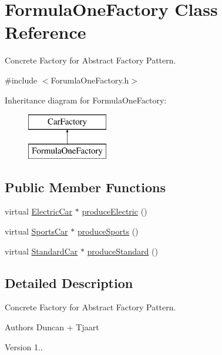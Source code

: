 \hypertarget{class_formula_one_factory}{}\section{Formula\+One\+Factory Class Reference}
\label{class_formula_one_factory}


Concrete Factory for Abstract Factory Pattern.  




{\ttfamily \#include $<$Forumla\+One\+Factory.\+h$>$}

Inheritance diagram for Formula\+One\+Factory\+:\begin{figure}[H]
\begin{center}
\leavevmode
\includegraphics[height=2.000000cm]{class_formula_one_factory}
\end{center}
\end{figure}
\subsection*{Public Member Functions}
\begin{DoxyCompactItemize}
\item 
virtual \mbox{\hyperlink{class_electric_car}{Electric\+Car}} $\ast$ \mbox{\hyperlink{class_formula_one_factory_a84f67420468555a786c8103e21deeaf8}{produce\+Electric}} ()
\item 
virtual \mbox{\hyperlink{class_sports_car}{Sports\+Car}} $\ast$ \mbox{\hyperlink{class_formula_one_factory_a33707e14c22e124b204f268cca3ad21a}{produce\+Sports}} ()
\item 
virtual \mbox{\hyperlink{class_standard_car}{Standard\+Car}} $\ast$ \mbox{\hyperlink{class_formula_one_factory_ad58bf42a7a84218f3b022b3b3f6859d4}{produce\+Standard}} ()
\end{DoxyCompactItemize}


\subsection{Detailed Description}
Concrete Factory for Abstract Factory Pattern. 

\begin{DoxyAuthor}{Authors}
Duncan + Tjaart 
\end{DoxyAuthor}
\begin{DoxyVersion}{Version}
1.. 
\end{DoxyVersion}


